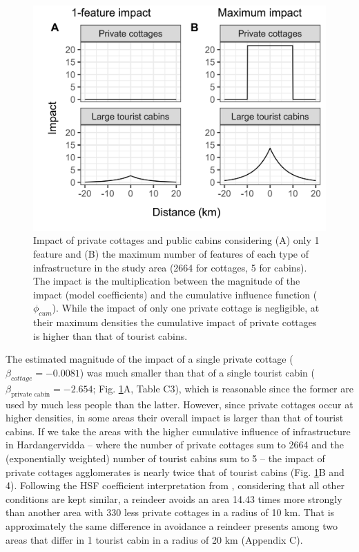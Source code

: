 \documentclass[titlepage]{article}
\begin{document}
\begin{figure}[h]
\centering
\includegraphics[width=1\textwidth,center]{figures/reindeer_zoi_impact_single_multiple_features.png}
\caption{\label{fig:impact_plot} Impact of private cottages and public cabins considering (A) only 1 feature and (B) the maximum number of features of each type of infrastructure in the study area (2664 for cottages, 5 for cabins). The impact is the multiplication between the magnitude of the impact (model coefficients) and the cumulative influence function ($\phi_{cum}$). While the impact of only one private cottage is negligible, at their maximum densities the cumulative impact of private cottages is higher than that of tourist cabins.}
\end{figure}

The estimated magnitude of the impact of a single private
cottage ($\beta_{cottage} = -0.0081$) was much smaller than that of a single tourist cabin
($\beta_{\text{private cabin}} = -2.654$; Fig. \ref{fig:impact_plot}A, Table C3), which is reasonable since the former are used by much less people than the latter. However, since
private cottages occur at higher densities, in some areas their overall impact 
is larger than that of tourist cabins. If we take the areas with the 
higher cumulative influence of infrastructure in Hardangervidda -- where the number of private cottages sum to 2664 
and the (exponentially weighted) number of tourist cabins sum to 5 -- the impact of 
private cottages agglomerates is nearly twice that of tourist cabins
 (Fig. \ref{fig:impact_plot}B and 4). Following the HSF coefficient interpretation from \citet{fieberg_how_2021}, considering that all other conditions are kept similar, a reindeer avoids an area 14.43 times more strongly than another area with
330 less private cottages in a radius of 10 km. That is approximately the same difference in avoidance a reindeer presents among two areas 
that differ in 1 tourist cabin in a radius of 20 km (Appendix C).
\end{document}
